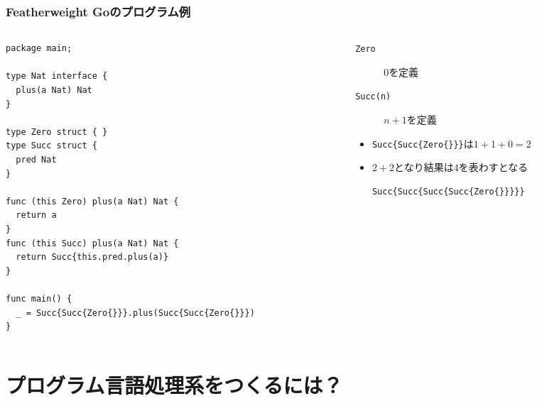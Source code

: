 \begin{frame}[fragile]
  \frametitle{Featherweight Goのプログラム例}

  \begin{columns}
    \begin{column}{0.6\textwidth}
\begin{lstlisting}[style=go]
package main;

type Nat interface {
  plus(a Nat) Nat
}

type Zero struct { }
type Succ struct {
  pred Nat
}

func (this Zero) plus(a Nat) Nat {
  return a
}
func (this Succ) plus(a Nat) Nat {
  return Succ{this.pred.plus(a)}
}

func main() {
  _ = Succ{Succ{Zero{}}}.plus(Succ{Succ{Zero{}}})
}
\end{lstlisting}
    \end{column}
    \begin{column}{0.4\textwidth}
      \pause
      \begin{description}
        \item[\texttt{Zero}] $0$を定義
        \item[\texttt{Succ(n)}] $n + 1$を定義
      \end{description}

      \pause

      \pause
      \begin{itemize}
        \item<+-> \lstinline|Succ{Succ{Zero{}}}|は$1 + 1 + 0 = 2$

        \item<+-> $2 + 2$となり結果は$4$を表わすとなる
        \begin{lstlisting}[style=plain]
Succ{Succ{Succ{Succ{Zero{}}}}}
        \end{lstlisting}
      \end{itemize}
    \end{column}
  \end{columns}
\end{frame}


\section{プログラム言語処理系をつくるには？}

